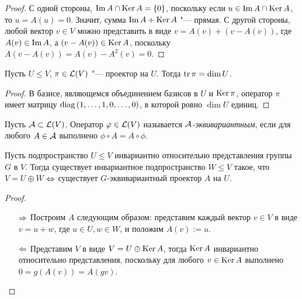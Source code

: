 \begin{proof}
	С одной стороны, $\operatorname{Im}{A} \cap \operatorname{Ker}{A} = \{0\}$, поскольку если $u \in \operatorname{Im}{A} \cap \operatorname{Ker}{A}$, то $u = A(u) = 0$. Значит, сумма $\operatorname{Im}{A} + \operatorname{Ker}{A}$ "--- прямая. С другой стороны, любой вектор $v \in V$ можно представить в виде $v = A(v) + (v - A(v))$, где $A(v) \in \operatorname{Im}{A}$, а $(v - A(v)) \in \operatorname{Ker}{A}$, поскольку $A(v - A(v)) = A(v) - A^2(v) = 0$.
\end{proof}

\begin{corollary}
	Пусть $U \le V$, $\pi \in \mathcal L(V)$ "--- проектор на $U$. Тогда $\operatorname{tr}\pi = \dim{U}$.
\end{corollary}

\begin{proof}
	В базисе, являющемся объединением базисов в $U$ и $\operatorname{Ker}\pi$, оператор $\pi$ имеет матрицу $\operatorname{diag}{(1, \dotsc, 1, 0, \dotsc, 0)}$, в которой ровно $\dim{U}$ единиц.
\end{proof}

\begin{definition}
	Пусть $\mathcal A\subset \mathcal L(V)$. Оператор $\varphi \in \mathcal L(V)$ называется \textit{$\mathcal A$-эквивариантным}, если для любого $A \in \mathcal A$ выполнено $\phi \circ A = A \circ \phi$.
\end{definition}

\begin{proposition}
	Пусть подпространство $U \le V$ инвариантно относительно представления группы $G$ в $V$. Тогда существует инвариантное подпространство $W \le V$ такое, что $V = U \oplus W$ $\Leftrightarrow$ существует $G$-эквивариантный проектор $A$ на $U$.
\end{proposition}

\begin{proof}~
	\begin{enumerate}
		\item[$\Rightarrow$] Построим $A$ следующим образом: представим каждый вектор $v \in V$ в виде $v = u + w$, где $u \in U, w \in W$, и положим $A(v) := u$.
		\item[$\Leftarrow$] Представим $V$ в виде $V = U \oplus \operatorname{Ker}{A}$, тогда $\operatorname{Ker}{A}$ инвариантно относительно представления, поскольку для любого $v \in \operatorname{Ker}{A}$ выполнено $0 = g(A(v)) = A(gv)$.\qedhere
	\end{enumerate}
\end{proof}